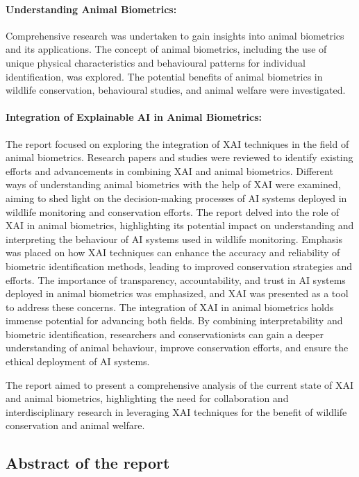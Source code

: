 \documentclass{article}
\begin{document}
\paragraph{Understanding Animal Biometrics:} Comprehensive research was undertaken to gain insights into animal biometrics and its applications.
The concept of animal biometrics, including the use of unique physical characteristics and behavioural patterns for individual identification, was explored.
The potential benefits of animal biometrics in wildlife conservation, behavioural studies, and animal welfare were investigated.
\paragraph{Integration of Explainable AI in Animal Biometrics:}
The report focused on exploring the integration of XAI techniques in the field of animal biometrics. Research papers and studies were reviewed to identify existing efforts and advancements in combining XAI and animal biometrics. Different ways of understanding animal biometrics with the help of XAI were examined, aiming to shed light on the decision-making processes of AI systems deployed in wildlife monitoring and conservation efforts.
\newline
The report delved into the role of XAI in animal biometrics, highlighting its potential impact on understanding and interpreting the behaviour of AI systems used in wildlife monitoring.
Emphasis was placed on how XAI techniques can enhance the accuracy and reliability of biometric identification methods, leading to improved conservation strategies and efforts.
The importance of transparency, accountability, and trust in AI systems deployed in animal biometrics was emphasized, and XAI was presented as a tool to address these concerns.
The integration of XAI in animal biometrics holds immense potential for advancing both fields. By combining interpretability and biometric identification, researchers and conservationists can gain a deeper understanding of animal behaviour, improve conservation efforts, and ensure the ethical deployment of AI systems.

The report aimed to present a comprehensive analysis of the current state of XAI and animal biometrics, highlighting the need for collaboration and interdisciplinary research in leveraging XAI techniques for the benefit of wildlife conservation and animal welfare.

\subsection{Abstract of the report}
\end{document}
